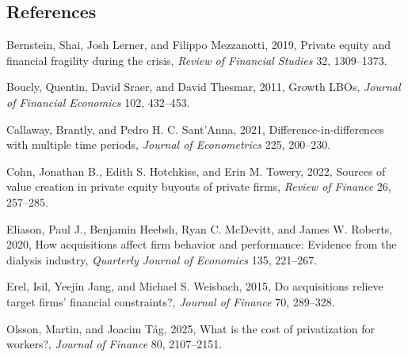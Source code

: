 \documentclass[12pt,a4paper]{article}
\newenvironment{refs}{\begin{list}{}{\setlength{\leftmargin}{1.5em}\setlength{\itemindent}{-1.5em}\setlength{\itemsep}{1pt}}}{\end{list}}
\begin{document}
\subsection*{References}
\begin{refs}
\item Bernstein, Shai, Josh Lerner, and Filippo Mezzanotti, 2019, Private equity and financial fragility during the crisis, \emph{Review of Financial Studies} 32, 1309--1373.
\item Boucly, Quentin, David Sraer, and David Thesmar, 2011, Growth LBOs, \emph{Journal of Financial Economics} 102, 432--453.
\item Callaway, Brantly, and Pedro H. C. Sant'Anna, 2021, Difference-in-differences with multiple time periods, \emph{Journal of Econometrics} 225, 200--230.
\item Cohn, Jonathan B., Edith S. Hotchkiss, and Erin M. Towery, 2022, Sources of value creation in private equity buyouts of private firms, \emph{Review of Finance} 26, 257--285.
\item Eliason, Paul J., Benjamin Heebsh, Ryan C. McDevitt, and James W. Roberts, 2020, How acquisitions affect firm behavior and performance: Evidence from the dialysis industry, \emph{Quarterly Journal of Economics} 135, 221--267.
\item Erel, Isil, Yeejin Jang, and Michael S. Weisbach, 2015, Do acquisitions relieve target firms' financial constraints?, \emph{Journal of Finance} 70, 289--328.
\item Olsson, Martin, and Joacim T\aa g, 2025, What is the cost of privatization for workers?, \emph{Journal of Finance} 80, 2107--2151.
\end{refs}
\end{document}
